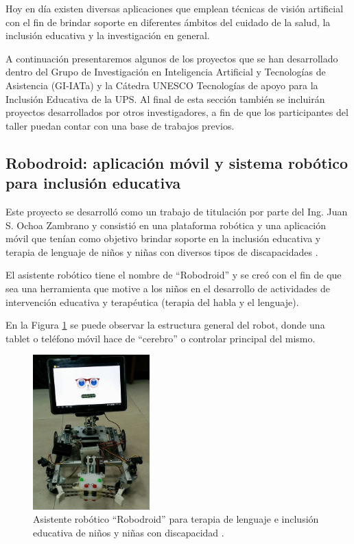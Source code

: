 \documentclass[a4paper,10pt]{article}
\begin{document}
Hoy en día existen diversas aplicaciones que emplean técnicas de visión artificial con el fin de brindar soporte en diferentes ámbitos del cuidado de la salud, la inclusión educativa y la investigación en general.

A continuación presentaremos algunos de los proyectos que se han desarrollado dentro del Grupo de Investigación en Inteligencia Artificial y Tecnologías de Asistencia (GI-IATa) y la Cátedra UNESCO Tecnologías de apoyo para la Inclusión Educativa de la UPS. Al final de esta sección también se incluirán proyectos desarrollados por otros investigadores, a fin de que los participantes del taller puedan contar con una base de trabajos previos.

\subsection{Robodroid: aplicación móvil y sistema robótico para inclusión educativa}

Este proyecto se desarrolló como un trabajo de titulación por parte del Ing. Juan S. Ochoa Zambrano y consistió en una plataforma robótica y una aplicación móvil que tenían como objetivo brindar soporte en la inclusión educativa y terapia de lenguaje de niños y niñas con diversos tipos de discapacidades \cite{robles2015speltra, ochoa2014diseno, ochoa2016new}.

El asistente robótico tiene el nombre de ``Robodroid'' y se creó con el fin de que sea una herramienta que motive a los niños en el desarrollo de actividades de intervención educativa y terapéutica (terapia del habla y el lenguaje).

En la Figura \ref{Fig:Robodroid} se puede observar la estructura general del robot, donde una tablet o teléfono móvil hace de ``cerebro'' o controlar principal del mismo.

\begin{figure}[th!]
	\centering
	\includegraphics[width = 0.4\textwidth]{images/RoboDroid.jpg}
	\caption{Asistente robótico ``Robodroid'' para terapia de lenguaje e inclusión educativa de niños y niñas con discapacidad \cite{robles2015speltra}.}
	\label{Fig:Robodroid}
\end{figure}
\end{document}
